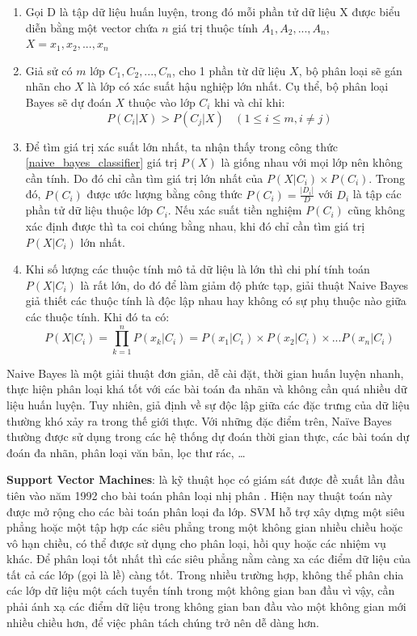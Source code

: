 \begin{enumerate}
    \item Gọi D là tập dữ liệu huấn luyện, trong đó mỗi phần tử dữ liệu X được biểu diễn
        bằng một vector chứa $n$ giá trị thuộc tính $A_1, A_2, ..., A_n$, $X={x_1, x_2, ..., x_n}$
    \item Giả sử có $m$ lớp $C_1, C_2, ..., C_n$, cho 1 phần từ dữ liệu $X$, bộ phân loại sẽ gán 
        nhãn cho $X$ là lớp có xác suất hậu nghiệp lớn nhất. Cụ thể, bộ phân loại Bayes sẽ
        dự đoán $X$ thuộc vào lớp $C_i$ khi và chỉ khi:
        \begin{equation}
            \label{naive_bayes_classifier}
            P(C_i|X) > P(C_j|X) ~~~~ (1\leq i \leq m, i\neq j)
        \end{equation}
    \item Để tìm giá trị xác suất lớn nhất, ta nhận thấy trong công thức \ref{naive_bayes_classifier}
        giá trị $P(X)$ là giống nhau với mọi lớp nên không cần tính. Do đó chỉ cần tìm giá trị lớn 
        nhất của $P(X|C_i)\times P(C_i)$. Trong đó, $P(C_i)$ được ước lượng bằng công thức $P(C_i) = \frac{|D_i|}{D}$ 
        với $D_i$ là tập các phần tử dữ liệu thuộc lớp $C_i$. Nếu xác suất tiền nghiệm $P(C_i)$ cũng không xác định 
        được thì ta coi chúng bằng nhau, khi đó chỉ cần tìm giá trị $P(X|C_i)$ lớn nhất.
    \item Khi số lượng các thuộc tính mô tả dữ liệu là lớn thì chi phí tính toán $P(X|C_i)$ là 
        rất lớn, do đó để làm giảm độ phức tạp, giải thuật Naive Bayes giả thiết các thuộc
        tính là độc lập nhau hay không có sự phụ thuộc nào giữa các thuộc tính. Khi đó
        ta có:
        \begin{equation}
            P(X|C_i) = \prod_{k=1}^n P(x_k|C_i) = P(x_1|C_i)\times P(x_2|C_i) \times ... P(x_n|C_i)
        \end{equation}
\end{enumerate}
Naive Bayes là một giải thuật đơn giản, dễ cài đặt, thời gian huấn luyện nhanh, thực
hiện phân loại khá tốt với các bài toán đa nhãn và không cần quá nhiều dữ liệu huấn
luyện. Tuy nhiên, giả định về sự độc lập giữa các đặc trưng của dữ liệu thường khó xảy
ra trong thế giới thực. Với những đặc điểm trên, Naïve Bayes thường được sử dụng trong
các hệ thống dự đoán thời gian thực, các bài toán dự đoán đa nhãn, phân loại văn bản,
lọc thư rác, …

\textbf{Support Vector Machines}: là kỹ thuật học có giám sát được đề xuất lần đầu
tiên vào năm 1992 cho bài toán phân loại nhị phân \cite{hearst1998support}. Hiện nay thuật toán này được mở
rộng cho các bài toán phân loại đa lớp. SVM hỗ trợ xây dựng một siêu phẳng hoặc một tập hợp các siêu phẳng trong một
không gian nhiều chiều hoặc vô hạn chiều, có thể được sử dụng cho phân loại, hồi quy hoặc các 
nhiệm vụ khác. Để phân loại tốt nhất thì các siêu phẳng nằm càng xa các điểm
dữ liệu của tất cả các lớp (gọi là lề) càng tốt. Trong nhiều trường hợp, không thể phân
chia các lớp dữ liệu một cách tuyến tính trong một không gian ban đầu vì vậy, cần phải
ánh xạ các điểm dữ liệu trong không gian ban đầu vào một không gian mới nhiều chiều
hơn, để việc phân tách chúng trở nên dễ dàng hơn.

